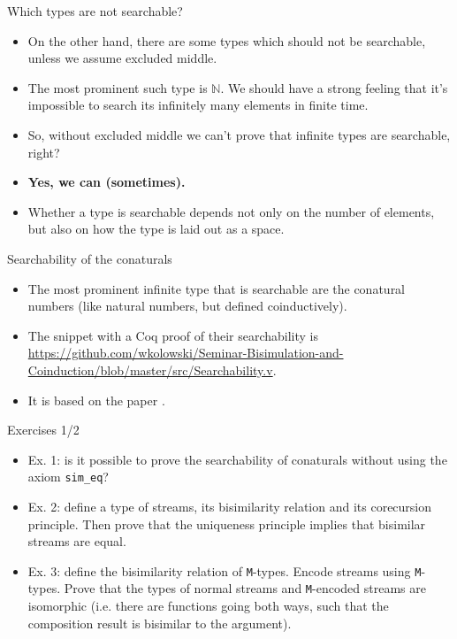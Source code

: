 \documentclass{beamer}
\begin{document}
\begin{frame}{Which types are not searchable?}
\begin{itemize}
	\item On the other hand, there are some types which should not be searchable, unless we assume excluded middle.
	\item The most prominent such type is $\mathbb{N}$. We should have a strong feeling that it's impossible to search its infinitely many elements in finite time.
	\item So, without excluded middle we can't prove that infinite types are searchable, right?
	\item \textbf{Yes, we can (sometimes).}
	\item Whether a type is searchable depends not only on the number of elements, but also on how the type is laid out as a space.
\end{itemize}
\end{frame}

\begin{frame}{Searchability of the conaturals}
\begin{itemize}
	\item The most prominent infinite type that is searchable are the conatural numbers (like natural numbers, but defined coinductively).
	\item The snippet with a Coq proof of their searchability is \url{https://github.com/wkolowski/Seminar-Bisimulation-and-Coinduction/blob/master/src/Searchability.v}.
	\item It is based on the paper \href{https://www.cs.bham.ac.uk/~mhe/papers/omniscient-journal-revised.pdf}{\color{blue}{Infinite sets that Satisfy the Principle of Omniscience in any Variety of Constructive Mathematics}}.
\end{itemize}
\end{frame}

\begin{frame}{Exercises 1/2}
\begin{itemize}
	\item Ex. 1: is it possible to prove the searchability of conaturals without using the axiom \texttt{sim\_eq}?
	\item Ex. 2: define a type of streams, its bisimilarity relation and its corecursion principle. Then prove that the uniqueness principle implies that bisimilar streams are equal.
	\item Ex. 3: define the bisimilarity relation of \texttt{M}-types. Encode streams using \texttt{M}-types. Prove that the types of normal streams and \texttt{M}-encoded streams are isomorphic (i.e. there are functions going both ways, such that the composition result is bisimilar to the argument).
\end{itemize}
\end{frame}
\end{document}

